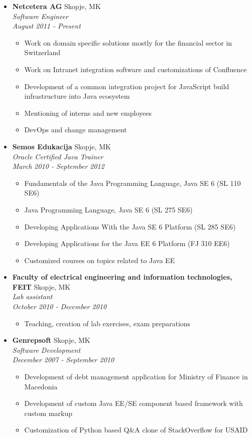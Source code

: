\documentclass[letterpaper,11pt]{article}
\newcommand{\resitem}[1]{\item #1 \vspace{-2pt}}
\newcommand{\ressubheading}[4]{
  \textbf{#1}  #2\\
  \textit{#3}\\ \textit{#4}\\
}
\begin{document}
\begin{itemize}

\item []  
\ressubheading{Netcetera AG}{Skopje, MK}{Software Engineer}{August 2011 - Present}
	\begin{itemize}
      \resitem{ Work on domain specific solutions mostly for the financial sector in Switzerland}
      \resitem{ Work on Intranet integration software and customizations of Confluence}     
      \resitem{ Development of a common integration project for JavaScript build infrastructure into Java ecosystem}
      \resitem{ Mentioning of interns and new employees }
      \resitem{ DevOps and change management}
	\end{itemize}

\item []

	\ressubheading{Semos Edukacija }{Skopje, MK}{ Oracle Certified Java Trainer }{March 2010 - September 2012}

	\begin{itemize}
 
      \resitem{Fundamentals of the Java Programming Language, Java SE 6 (SL 110 SE6) }
      \resitem{Java Programming Language, Java SE 6 (SL 275 SE6) }
      \resitem{Developing Applications With the Java SE 6 Platform (SL 285 SE6)}
      \resitem{Developing Applications for the Java EE 6 Platform (FJ 310 EE6)}
      \resitem{Customized courses on topics related to Java EE}

	\end{itemize}
	
\item []

	\ressubheading{Faculty of electrical engineering and information technologies, FEIT }{Skopje, MK}{Lab assistant}{October 2010 - December 2010}

	\begin{itemize}
 
      \resitem{Teaching, creation of lab exercises, exam preparations }
     
	\end{itemize}

\item []

	\ressubheading{Genrepsoft}{Skopje, MK}{Software Development}{December 2007 - September 2010}

	\begin{itemize}
      
      \resitem{Development of debt management application for Ministry of Finance in Macedonia}
      \resitem{Development of custom Java EE/SE component based framework with custom markup}
      \resitem{Customization of Python based Q\&A clone of StackOverflow for USAID  }
    

\end{itemize}
\end{itemize}
\end{document}
